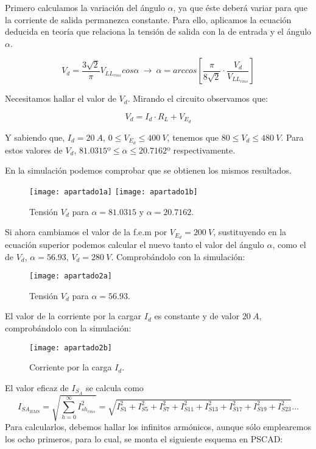 \documentclass[10pt]{article}
\begin{document}
	Primero calculamos la variación del ángulo $\alpha$, ya que éste deberá variar para que la corriente de salida permanezca constante. Para ello, aplicamos la ecuación deducida en teoría que relaciona la tensión de salida con la de entrada y el ángulo $\alpha$.
	
	$$V_d=\frac{3\sqrt{2}}{\pi}V_{LL_{rms}}cos\alpha\ \rightarrow\ \alpha=arc cos\left[\frac{\pi}{8\sqrt{2}}\cdot\frac{V_d}{V_{LL_{rms}}}\right]$$
	
	Necesitamos hallar el valor de $V_d$. Mirando el circuito observamos que:
	
	$$V_d=I_d\cdot R_L+V_{E_d}$$
	
	Y sabiendo que, $I_d=20\ A$, $0\leq V_{E_d}\leq 400\ V$, tenemos que $80\leq V_d\leq 480\ V$. Para estos valores de $V_d$, $81.0315º\leq \alpha\leq 20.7162º$ respectivamente.
	
	En la simulación podemos comprobar que se obtienen los mismos resultados.	
	
	\begin{figure}[H]
		\begin{center}
			\texttt{[image: apartado1a]}
			\texttt{[image: apartado1b]}
		\end{center}\caption{Tensión $V_d$ para $\alpha=81.0315$ y $\alpha = 20.7162$.}
	\end{figure}
	
	Si ahora cambiamos el valor de la f.e.m por $V_{E_d}=200\ V$, sustituyendo en la ecuación superior podemos calcular el nuevo tanto el valor del ángulo $\alpha$, como el de $V_d$, $\alpha = 56.93$, $V_d=280\ V$. Comprobándolo con la simulación:
	
	\begin{figure}[H]
		\begin{center}
			\texttt{[image: apartado2a]}
		\end{center}\caption{Tensión $V_d$ para $\alpha=56.93$.}
	\end{figure}

	El valor de la corriente por la cargar $I_d$ es constante y de valor $20\ A$, comprobándolo con la simulación:
	
	\begin{figure}[H]
		\begin{center}
			\texttt{[image: apartado2b]}
		\end{center}\caption{Corriente por la carga $I_d$.}
	\end{figure}

	El valor eficaz de $I_{S_A}$ se calcula como $$I_{{SA}_{RMS}}=\sqrt{\sum_{h=0}^{\infty}I^2_{{sh}_{rms}}} = \sqrt{I^2_{S1}+I^2_{S5}+I^2_{S7}+I^2_{S11}+I^2_{S13}+I^2_{S17}+I^2_{S19}+I^2_{S23}}...$$ Para calcularlos, debemos hallar los infinitos armónicos, aunque sólo emplearemos los ocho primeros, para lo cual, se monta el siguiente esquema en PSCAD:
	
\end{document}
